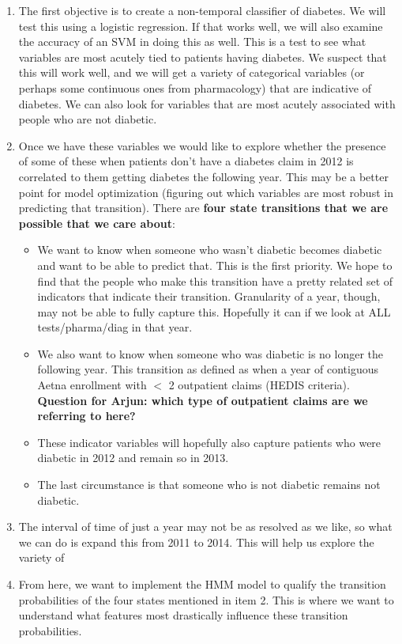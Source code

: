 \documentclass{article}
\begin{document}
\begin{enumerate}
\item The first objective is to create a non-temporal classifier of diabetes. We will test this using a logistic regression. If that works well, we will also examine the accuracy of an SVM in doing this as well. This is a test to see what variables are most acutely tied to patients having diabetes. We suspect that this will work well, and we will get a variety of categorical variables (or perhaps some continuous ones from pharmacology) that are indicative of diabetes. We can also look for variables that are most acutely associated with people who are not diabetic.

\item Once we have these variables we would like to explore whether the presence of some of these when patients don't have a diabetes claim in 2012 is correlated to them getting diabetes the following year. This may be a better point for model optimization (figuring out which variables are most robust in predicting that transition).  There are \textbf{four state transitions that we are possible that we care about}: 

\begin{itemize}
\item We want to know when someone who wasn't diabetic becomes diabetic and want to be able to predict that. This is the first priority. We hope to find that the people who make this transition have a pretty related set of indicators that indicate their transition. Granularity of a year, though, may not be able to fully capture this. Hopefully it can if we look at ALL tests/pharma/diag in that year.

\item We also want to know when someone who was diabetic is no longer the following year. This transition as defined as when a year of contiguous Aetna enrollment with $<$ 2 outpatient claims (HEDIS criteria). \textbf{Question for Arjun: which type of outpatient claims are we referring to here?}

\item These indicator variables will hopefully also capture patients who were diabetic in 2012 and remain so in 2013. 

\item The last circumstance is that someone who is not diabetic remains not diabetic. 
\end{itemize}

\item 	The interval of time of just a year may not be as resolved as we like, so what we can do is expand this from 2011 to 2014. This will help us explore the variety of 

\item From here, we want to implement the HMM model to qualify the transition probabilities of the four states mentioned in item 2. This is where we want to understand what features most drastically influence these transition probabilities. 
\end{enumerate}
\end{document}
